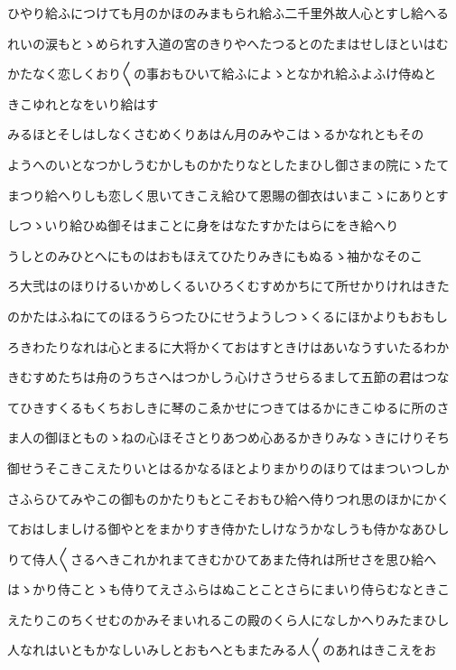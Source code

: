 \documentclass[a4paper,11pt,landscape]{ltjtarticle}
\begin{document}
ひやり給ふにつけても月のかほのみまもられ給ふ二千里外故人心とすし給へる
\par\medskip
れいの涙もとゝめられす入道の宮のきりやへたつるとのたまはせしほといはむ
\par\medskip
かたなく恋しくおり〱の事おもひいて給ふによゝとなかれ給ふよふけ侍ぬと
\par\medskip
きこゆれとなをいり給はす
\par\medskip
みるほとそしはしなくさむめくりあはん月のみやこはゝるかなれともその
\par\medskip
ようへのいとなつかしうむかしものかたりなとしたまひし御さまの院にゝたて
\par\medskip
まつり給へりしも恋しく思いてきこえ給ひて恩賜の御衣はいまこゝにありとす
\par\medskip
しつゝいり給ひぬ御そはまことに身をはなたすかたはらにをき給へり
\par\medskip
うしとのみひとへにものはおもほえてひたりみきにもぬるゝ袖かなそのこ
\par\medskip
ろ大弐はのほりけるいかめしくるいひろくむすめかちにて所せかりけれはきた
\par\medskip
のかたはふねにてのほるうらつたひにせうようしつゝくるにほかよりもおもし
\par\medskip
ろきわたりなれは心とまるに大将かくておはすときけはあいなうすいたるわか
\par\medskip
きむすめたちは舟のうちさへはつかしう心けさうせらるまして五節の君はつな
\par\medskip
てひきすくるもくちおしきに琴のこゑかせにつきてはるかにきこゆるに所のさ
\par\medskip
ま人の御ほとものゝねの心ほそさとりあつめ心あるかきりみなゝきにけりそち
\par\medskip
御せうそこきこえたりいとはるかなるほとよりまかりのほりてはまついつしか
\par\medskip
さふらひてみやこの御ものかたりもとこそおもひ給へ侍りつれ思のほかにかく
\par\medskip
ておはしましける御やとをまかりすき侍かたしけなうかなしうも侍かなあひし
\par\medskip
りて侍人〱さるへきこれかれまてきむかひてあまた侍れは所せさを思ひ給へ
\par\medskip
はゝかり侍ことゝも侍りてえさふらはぬことことさらにまいり侍らむなときこ
\par\medskip
えたりこのちくせむのかみそまいれるこの殿のくら人になしかへりみたまひし
\par\medskip
人なれはいともかなしいみしとおもへともまたみる人〱のあれはきこえをお
\end{document}
